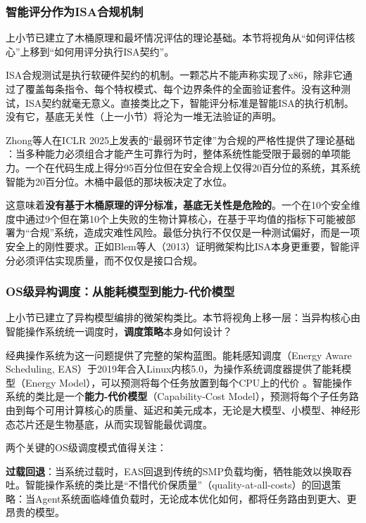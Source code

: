 \subsubsection{智能评分作为ISA合规机制}

上小节已建立了木桶原理和最坏情况评估的理论基础。本节将视角从``如何评估核心''上移到``如何用评分执行ISA契约''。

ISA合规测试是执行软硬件契约的机制。一颗芯片不能声称实现了x86，除非它通过了覆盖每条指令、每个特权模式、每个边界条件的全面验证套件。没有这种测试，ISA契约就毫无意义。直接类比之下，智能评分标准是智能ISA的执行机制。没有它，基底无关性（上一小节）将沦为一堆无法验证的声明。

Zhong等人在ICLR 2025上发表的``最弱环节定律''为合规的严格性提供了理论基础 \cite{zhong_2024_weakest_link}：当多种能力必须组合才能产生可靠行为时，整体系统性能受限于最弱的单项能力。一个在代码生成上得分95百分位但在安全合规上仅得20百分位的系统，其系统智能为20百分位。木桶中最低的那块板决定了水位。

这意味着\textbf{没有基于木桶原理的评分标准，基底无关性是危险的}。一个在10个安全维度中通过9个但在第10个上失败的生物计算核心，在基于平均值的指标下可能被部署为``合规''系统，造成灾难性风险。最低分执行不仅仅是一种测试偏好，而是一项安全上的刚性要求。正如Blem等人（2013）证明微架构比ISA本身更重要，智能评分必须评估实现质量，而不仅仅是接口合规。

\subsubsection{OS级异构调度：从能耗模型到能力-代价模型}

上小节已建立了异构模型编排的微架构类比。本节将视角上移一层：当异构核心由智能操作系统统一调度时，\textbf{调度策略}本身如何设计？

经典操作系统为这一问题提供了完整的架构蓝图。能耗感知调度（Energy Aware Scheduling, EAS）于2019年合入Linux内核5.0，为操作系统调度器提供了能耗模型（Energy Model），可以预测将每个任务放置到每个CPU上的代价 \cite{eas_linux_2019}。智能操作系统的类比是一个\textbf{能力-代价模型}（Capability-Cost Model），预测将每个子任务路由到每个可用计算核心的质量、延迟和美元成本，无论是大模型、小模型、神经形态芯片还是生物基底，从而实现智能最优调度。

两个关键的OS级调度模式值得关注：

\textbf{过载回退}：当系统过载时，EAS回退到传统的SMP负载均衡，牺牲能效以换取吞吐。智能操作系统的类比是``不惜代价保质量''（quality-at-all-costs）的回退策略：当Agent系统面临峰值负载时，无论成本优化如何，都将任务路由到更大、更昂贵的模型。

